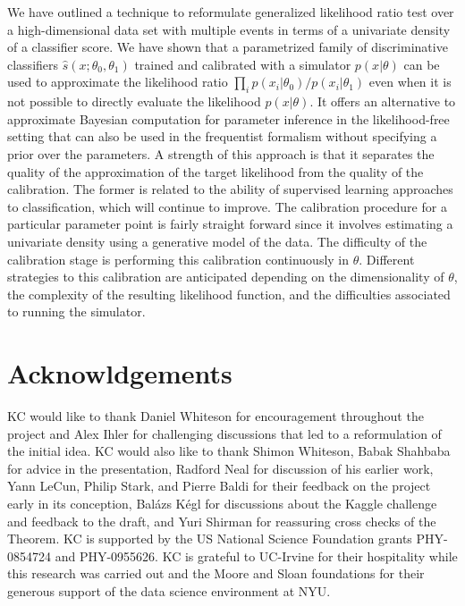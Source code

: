 \documentclass[aoas,preprint]{imsart}
\numberwithin{equation}{section}
\theoremstyle{plain}
\begin{document}
We have outlined a technique to reformulate generalized likelihood ratio test over a high-dimensional data set with multiple events in terms of a univariate density of a classifier score. 
We have shown that a parametrized family of discriminative classifiers $\hat s(x; \theta_0, \theta_1)$ trained and calibrated with a simulator  $p(x|\theta)$ can be used to approximate the  likelihood ratio  $\prod_i p(x_i|\theta_0)/p(x_i|\theta_1)$ even when it is not possible to directly evaluate the likelihood $p(x|\theta)$. 
It offers an alternative to approximate Bayesian computation for parameter inference in the likelihood-free setting that can also be used in the frequentist formalism without specifying a prior over the parameters. A strength of this approach is that it separates the quality of the approximation of the target likelihood from the quality of the calibration. The former is related to the ability of supervised learning approaches to  classification, which will continue to improve. The calibration procedure for a particular parameter point is fairly straight forward since it involves estimating a univariate density using a generative model of the data. The difficulty of the calibration stage is performing this calibration continuously in $\theta$. Different strategies to this calibration are anticipated depending on the dimensionality of $\theta$, the complexity of the resulting likelihood function, and the difficulties associated to running the simulator.




\section*{Acknowldgements}
KC would like to thank  
Daniel Whiteson for encouragement throughout the project and
Alex Ihler for challenging discussions that 
led to a reformulation of the initial idea. KC would also like to thank Shimon Whiteson, Babak Shahbaba for advice in the presentation, Radford Neal for discussion of his earlier work, Yann LeCun, Philip Stark, and Pierre Baldi for their feedback on the
project early in its conception, Bal\'azs K\'egl for discussions about the Kaggle challenge and feedback to the draft, 
and Yuri Shirman for reassuring cross checks of the Theorem. 
KC is supported by the US National Science Foundation grants PHY-0854724 and PHY-0955626. 
KC is grateful to UC-Irvine for their hospitality while this research was carried out and the 
Moore and Sloan foundations for their generous support of the data science environment at NYU.


%


\end{document}
